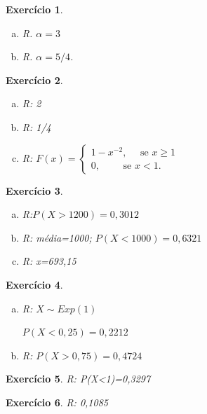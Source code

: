 \documentclass[letter,11pt]{article}
\newtheorem{exer}{Exercício}
\begin{document}
\medskip
\begin{exer} \rm
\begin{enumerate}[a)]
\item  R. $\alpha=3$
\item  R. $\alpha=5/4$. 
\end{enumerate}
\end{exer} %



\medskip
\begin{exer} \rm
\begin{enumerate}[a)]
\item R: 2
\item R: 1/4
\item R: $F(x)=\begin{cases} 1-x^{-2},\quad \mbox{ se } x\geq 1\\
                       0, \quad \quad       \mbox{ se } x<1.
        \end{cases}$
\end{enumerate}
\end{exer}%





\medskip
\begin{exer} \rm
\begin{enumerate}[a)]
\item R:$P(X>1200)=0,3012$
\item R: média=1000;   $P(X<1000)=0,6321$
\item R:  x=693,15
\end{enumerate}
\end{exer}


\medskip
\begin{exer} \rm 
\begin{enumerate}[a)]
\item R:  $X \sim Exp(1)$
            
   $P(X<0,25)=0,2212$

\item R: $P(X>0,75)=0,4724$
\end{enumerate}
\end{exer}






\medskip
\begin{exer} \rm R: P(X<1)=0,3297
\end{exer}




\medskip
\begin{exer} \rm
R: 0,1085
\end{exer}%
\end{document}
